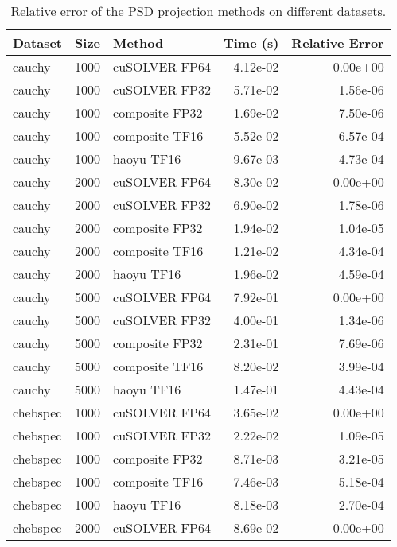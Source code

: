 \begin{table}
\centering
\caption{Relative error of the PSD projection methods on different datasets.}
\label{tab:benchmark_error}
\begin{tabular}{lrlrr}
\toprule
  Dataset &  Size &         Method &  Time (s) &  Relative Error \\
\midrule
   cauchy &  1000 &  cuSOLVER FP64 &  4.12e-02 &        0.00e+00 \\
   cauchy &  1000 &  cuSOLVER FP32 &  5.71e-02 &        1.56e-06 \\
   cauchy &  1000 & composite FP32 &  1.69e-02 &        7.50e-06 \\
   cauchy &  1000 & composite TF16 &  5.52e-02 &        6.57e-04 \\
   cauchy &  1000 &     haoyu TF16 &  9.67e-03 &        4.73e-04 \\
   cauchy &  2000 &  cuSOLVER FP64 &  8.30e-02 &        0.00e+00 \\
   cauchy &  2000 &  cuSOLVER FP32 &  6.90e-02 &        1.78e-06 \\
   cauchy &  2000 & composite FP32 &  1.94e-02 &        1.04e-05 \\
   cauchy &  2000 & composite TF16 &  1.21e-02 &        4.34e-04 \\
   cauchy &  2000 &     haoyu TF16 &  1.96e-02 &        4.59e-04 \\
   cauchy &  5000 &  cuSOLVER FP64 &  7.92e-01 &        0.00e+00 \\
   cauchy &  5000 &  cuSOLVER FP32 &  4.00e-01 &        1.34e-06 \\
   cauchy &  5000 & composite FP32 &  2.31e-01 &        7.69e-06 \\
   cauchy &  5000 & composite TF16 &  8.20e-02 &        3.99e-04 \\
   cauchy &  5000 &     haoyu TF16 &  1.47e-01 &        4.43e-04 \\
 chebspec &  1000 &  cuSOLVER FP64 &  3.65e-02 &        0.00e+00 \\
 chebspec &  1000 &  cuSOLVER FP32 &  2.22e-02 &        1.09e-05 \\
 chebspec &  1000 & composite FP32 &  8.71e-03 &        3.21e-05 \\
 chebspec &  1000 & composite TF16 &  7.46e-03 &        5.18e-04 \\
 chebspec &  1000 &     haoyu TF16 &  8.18e-03 &        2.70e-04 \\
 chebspec &  2000 &  cuSOLVER FP64 &  8.69e-02 &        0.00e+00 \\

\end{tabular}
\end{table}
